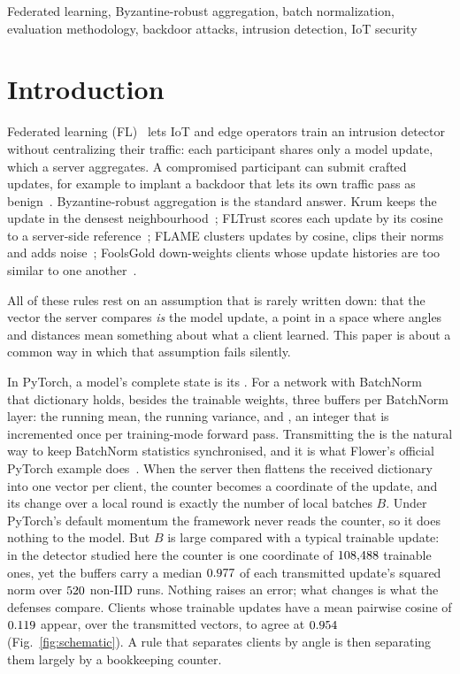 \documentclass[journal]{IEEEtran}
\begin{document}
\begin{IEEEkeywords}
Federated learning, Byzantine-robust aggregation, batch normalization,
evaluation methodology, backdoor attacks, intrusion detection, IoT security
\end{IEEEkeywords}

\section{Introduction}

Federated learning (FL)~\cite{mcmahan2017,kairouz2021} lets IoT and edge
operators train an intrusion detector without centralizing their traffic: each
participant shares only a model update, which a server aggregates. A compromised
participant can submit crafted updates, for example to implant a backdoor that
lets its own traffic pass as benign~\cite{bagdasaryan2020,xie2020}.
Byzantine-robust aggregation is the standard answer. Krum keeps the update in the densest
neighbourhood~\cite{blanchard2017}; FLTrust scores each update by its cosine to
a server-side reference~\cite{cao2021fltrust}; FLAME clusters updates by cosine,
clips their norms and adds noise~\cite{nguyen2022flame}; FoolsGold down-weights
clients whose update histories are too similar to one
another~\cite{fung2020foolsgold}.

All of these rules rest on an assumption that is rarely written down: that the
vector the server compares \emph{is} the model update, a point in a space where
angles and distances mean something about what a client learned. This paper is
about a common way in which that assumption fails silently.

In PyTorch, a model's complete state is its \sd{}. For a network with
BatchNorm~\cite{ioffe2015batchnorm} that dictionary holds, besides the trainable
weights, three buffers per BatchNorm layer: the running mean, the running
variance, and \nbt{}, an integer that is incremented once per training-mode
forward pass. Transmitting the \sd{} is the natural way to keep BatchNorm
statistics synchronised, and it is what Flower's official PyTorch example
does~\cite{beutel2020flower}. When the server then flattens the received
dictionary into one vector per client, the counter becomes a coordinate of the
update, and its change over a local round is exactly the number of local
batches $B$. Under PyTorch's default momentum the framework never reads the
counter, so it does nothing to the model. But $B$ is large compared with a typical trainable
update: in the detector studied here the counter is one coordinate of
$108{,}488$ trainable ones, yet the buffers carry a median $0.977$
of each transmitted update's squared norm over $520$ non-IID runs.
Nothing raises an error; what changes is what the defenses compare. Clients whose
trainable updates have a mean pairwise cosine of $0.119$ appear,
over the transmitted vectors, to agree at $0.954$
(Fig.~\ref{fig:schematic}). A rule that separates clients by angle is then separating
them largely by a bookkeeping counter.
\end{document}
